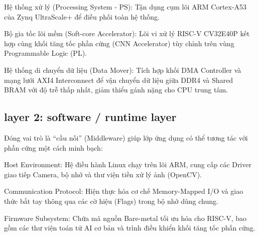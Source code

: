 Hệ thống xử lý (Processing System - PS): Tận dụng cụm lõi ARM Cortex-A53 của Zynq UltraScale+ để điều phối toàn hệ thống.

Bộ gia tốc lõi mềm (Soft-core Accelerator): Lõi vi xử lý RISC-V CV32E40P kết hợp cùng khối tăng tốc phần cứng (CNN Accelerator) tùy chỉnh trên vùng Programmable Logic (PL).

Hệ thống di chuyển dữ liệu (Data Mover): Tích hợp khối DMA Controller và mạng lưới AXI4 Interconnect để vận chuyển dữ liệu giữa DDR4 và Shared BRAM với độ trễ thấp nhất, giảm thiểu gánh nặng cho CPU trung tâm.

\subsection{layer 2: software / runtime layer}
Đóng vai trò là ``cầu nối'' (Middleware) giúp lớp ứng dụng có thể tương tác với phần cứng một cách minh bạch:

Host Environment: Hệ điều hành Linux chạy trên lõi ARM, cung cấp các Driver giao tiếp Camera, bộ nhớ và thư viện tiền xử lý ảnh (OpenCV).

Communication Protocol: Hiện thực hóa cơ chế Memory-Mapped I/O và giao thức bắt tay thông qua các cờ hiệu (Flags) trong bộ nhớ dùng chung.

Firmware Subsystem: Chứa mã nguồn Bare-metal tối ưu hóa cho RISC-V, bao gồm các thư viện toán tử AI cơ bản và trình điều khiển khối tăng tốc phần cứng.

